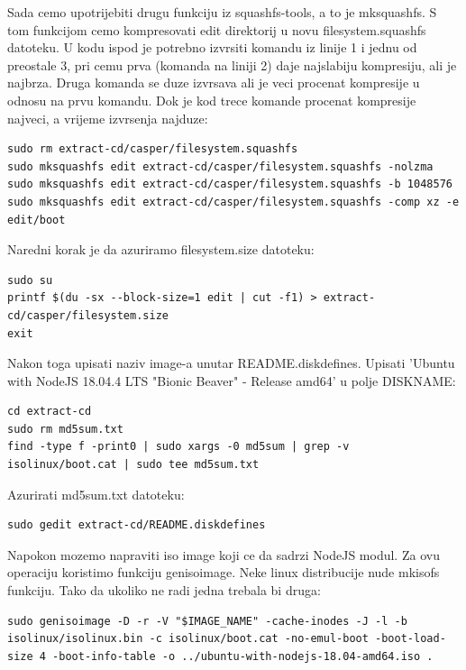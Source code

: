 \documentclass[12pt,vi]{mitthesis}
\begin{document}
\noindent
Sada cemo upotrijebiti drugu funkciju iz squashfs-tools, a to je mksquashfs. S tom funkcijom cemo kompresovati edit direktorij u novu filesystem.squashfs datoteku. U kodu ispod je potrebno izvrsiti komandu iz linije 1 i jednu od preostale 3, pri cemu prva (komanda na liniji 2) daje najslabiju kompresiju, ali je najbrza. Druga komanda se duze izvrsava ali je veci procenat kompresije u odnosu na prvu komandu. Dok je kod trece komande procenat kompresije najveci, a vrijeme izvrsenja najduze:
\begin{lstlisting}[style=BashInputStyle]
sudo rm extract-cd/casper/filesystem.squashfs
sudo mksquashfs edit extract-cd/casper/filesystem.squashfs -nolzma 
sudo mksquashfs edit extract-cd/casper/filesystem.squashfs -b 1048576
sudo mksquashfs edit extract-cd/casper/filesystem.squashfs -comp xz -e edit/boot
\end{lstlisting}

\noindent
Naredni korak je da azuriramo filesystem.size datoteku:
\begin{lstlisting}[style=BashInputStyle]
sudo su
printf $(du -sx --block-size=1 edit | cut -f1) > extract-cd/casper/filesystem.size
exit
\end{lstlisting}

\noindent
Nakon toga upisati naziv image-a unutar README.diskdefines. 
Upisati 'Ubuntu with NodeJS 18.04.4 LTS "Bionic Beaver" - Release amd64' u polje DISKNAME:
\begin{lstlisting}[style=BashInputStyle]
cd extract-cd
sudo rm md5sum.txt
find -type f -print0 | sudo xargs -0 md5sum | grep -v isolinux/boot.cat | sudo tee md5sum.txt
\end{lstlisting}

\noindent
Azurirati md5sum.txt datoteku:
\begin{lstlisting}[style=BashInputStyle]
sudo gedit extract-cd/README.diskdefines
\end{lstlisting}

\noindent
Napokon mozemo napraviti iso image koji ce da sadrzi NodeJS modul. Za ovu operaciju koristimo funkciju genisoimage. Neke linux distribucije nude mkisofs funkciju. Tako da ukoliko ne radi jedna trebala bi druga:
\begin{lstlisting}[style=BashInputStyle]
sudo genisoimage -D -r -V "$IMAGE_NAME" -cache-inodes -J -l -b isolinux/isolinux.bin -c isolinux/boot.cat -no-emul-boot -boot-load-size 4 -boot-info-table -o ../ubuntu-with-nodejs-18.04-amd64.iso .
\end{lstlisting}
\end{document}
